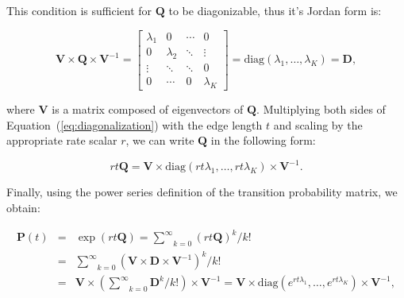 \noindent
This condition is sufficient for $\mathbf{Q}$ to be diagonizable, thus it's Jordan form is:

\begin{equation}
\mathbf{V}\times\mathbf{Q}\times\mathbf{V}^{-1}=\left[\begin{array}{cccc}
\lambda_{1} & 0 & \cdots & 0\\
0 & \lambda_{2} & \ddots & \vdots\\
\vdots & \ddots & \ddots & 0\\
0 & \cdots & 0 & \lambda_{K}
\end{array}\right]=\text{diag}(\lambda_{1},\ldots,\lambda_{K})=\mathbf{D} ,
\label{eq:diagonalization}
\end{equation}

\noindent where $\mathbf{V}$ is a matrix composed of eigenvectors of $\mathbf{Q}$. 
Multiplying both sides of Equation~(\ref{eq:diagonalization}) with the edge length $t$ and scaling by the appropriate rate scalar $r$, we can write $\mathbf{Q}$ in the following form:

\begin{equation}
rt\mathbf{Q}=\mathbf{V}\times\text{diag}(rt\lambda_{1},\ldots,rt\lambda_{K})\times\mathbf{V}^{-1} .
\end{equation}

\noindent Finally, using the power series definition of the transition probability matrix, we obtain: 

\begin{eqnarray}
\mathbf{P}(t) &=& \exp\left(rt\mathbf{Q}\right)  =  \underset{k=0}{\overset{\infty}{\sum}}\left(rt\mathbf{Q}\right)^{k}/k! \\ \nonumber
 &=&  \underset{k=0}{\overset{\infty}{\sum}}\left(\mathbf{V}\times\mathbf{D}\times\mathbf{V}^{-1}\right)^{k}/k! \\ \nonumber
 &=& \mathbf{V}\times\left(\underset{k=0}{\overset{\infty}{\sum}}\mathbf{D}^{k}/k!\right)\times\mathbf{V}^{-1} = \mathbf{V}\times\text{diag}(e^{rt\lambda_{1}},\ldots,e^{rt\lambda_{K}})\times\mathbf{V}^{-1} ,
\label{eq:eigen_decomposition}
\end{eqnarray}

